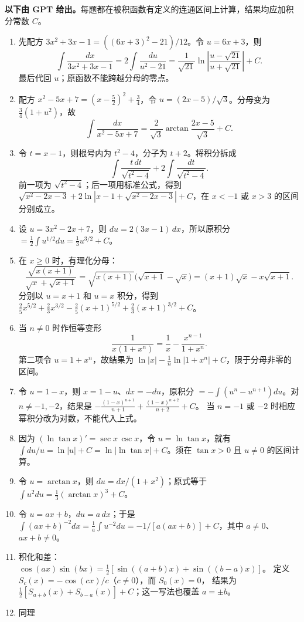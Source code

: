 \noindent\textbf{以下由 GPT 给出。}每题都在被积函数有定义的连通区间上计算，结果均应加积分常数 $C$。
\begin{enumerate}
\item 先配方 $3x^2+3x-1=((6x+3)^2-21)/12$。令 $u=6x+3$，则
\[
\int\frac{dx}{3x^2+3x-1}
=2\int\frac{du}{u^2-21}
=\frac1{\sqrt{21}}\ln\left|\frac{u-\sqrt{21}}{u+\sqrt{21}}\right|+C.
\]
最后代回 $u$；原函数不能跨越分母的零点。
\item 配方 $x^2-5x+7=(x-\tfrac52)^2+\tfrac34$，令 $u=(2x-5)/\sqrt3$。分母变为 $\tfrac34(1+u^2)$，故
\[
\int\frac{dx}{x^2-5x+7}
=\frac2{\sqrt3}\arctan\frac{2x-5}{\sqrt3}+C.
\]
\item 令 $t=x-1$，则根号内为 $t^2-4$，分子为 $t+2$。将积分拆成
\[
\int\frac{t\,dt}{\sqrt{t^2-4}}+2\int\frac{dt}{\sqrt{t^2-4}}.
\]
前一项为 $\sqrt{t^2-4}$；后一项用标准公式，得到
$\sqrt{x^2-2x-3}+2\ln|x-1+\sqrt{x^2-2x-3}|+C$，在 $x<-1$ 或 $x>3$ 的区间分别成立。
\item 设 $u=3x^2-2x+7$，则 $du=2(3x-1)\,dx$，所以原积分
$=\frac12\int u^{1/2}du=\frac13u^{3/2}+C$。
\item 在 $x\ge0$ 时，有理化分母：
\[
\frac{\sqrt{x(x+1)}}{\sqrt x+\sqrt{x+1}}
=\sqrt{x(x+1)}\bigl(\sqrt{x+1}-\sqrt x\bigr)
=(x+1)\sqrt x-x\sqrt{x+1}.
\]
分别以 $u=x+1$ 和 $u=x$ 积分，得到
$\frac25x^{5/2}+\frac23x^{3/2}-\frac25(x+1)^{5/2}+\frac23(x+1)^{3/2}+C$。
\item 当 $n\ne0$ 时作恒等变形
\[
\frac1{x(1+x^n)}=\frac1x-\frac{x^{n-1}}{1+x^n}.
\]
第二项令 $u=1+x^n$，故结果为
$\ln|x|-\frac1n\ln|1+x^n|+C$，限于分母非零的区间。
\item 令 $u=1-x$，则 $x=1-u$、$dx=-du$，原积分
$=-\int(u^n-u^{n+1})du$。对 $n\ne-1,-2$，结果是
$-\frac{(1-x)^{n+1}}{n+1}+\frac{(1-x)^{n+2}}{n+2}+C$。
当 $n=-1$ 或 $-2$ 时相应幂积分改为对数，不能代入上式。
\item 因为 $(\ln\tan x)'=\sec x\,\csc x$，令 $u=\ln\tan x$，就有
$\int du/u=\ln|u|+C=\ln|\ln\tan x|+C$。须在 $\tan x>0$ 且 $u\ne0$ 的区间计算。
\item 令 $u=\arctan x$，则 $du=dx/(1+x^2)$；原式等于
$\int u^2du=\frac13(\arctan x)^3+C$。
\item 令 $u=ax+b$，$du=a\,dx$；于是
$\int (ax+b)^{-2}dx=\frac1a\int u^{-2}du=-1/[a(ax+b)]+C$，其中 $a\ne0$、$ax+b\ne0$。
\item 积化和差：
$\cos(ax)\sin(bx)=\tfrac12[\sin((a+b)x)+\sin((b-a)x)]$。
定义 $S_c(x)=-\cos(cx)/c$（$c\ne0$），而 $S_0(x)=0$，
结果为 $\tfrac12[S_{a+b}(x)+S_{b-a}(x)]+C$；这一写法也覆盖 $a=\pm b$。
\item 同理

\end{enumerate}
